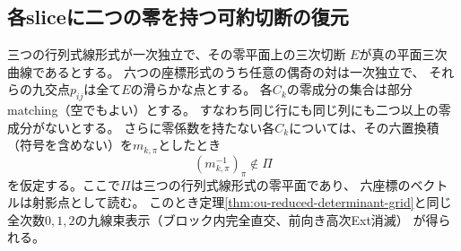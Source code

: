 \subsection{各sliceに二つの零を持つ可約切断の復元}
\label{subsec:ou-sparse-two-zero-grid}

\begin{lemma}[疎な係数行列に対する被約格子復元]
\label{lem:ou-two-zero-slice-grid}
三つの行列式線形式が一次独立で、その零平面上の三次切断
$E$が真の平面三次曲線であるとする。
六つの座標形式のうち任意の偶奇の対は一次独立で、
それらの九交点$p_{ij}$は全て$E$の滑らかな点とする。
各$C_k$の零成分の集合は部分matching（空でもよい）とする。
すなわち同じ行にも同じ列にも二つ以上の零成分がないとする。
さらに零係数を持たない各$C_k$については、その六置換積
（符号を含めない）を$m_{k,\pi}$としたとき
\[
 (m_{k,\pi}^{-1})_\pi\notin\Pi
\]
を仮定する。ここで$\Pi$は三つの行列式線形式の零平面であり、
六座標のベクトルは射影点として読む。
このとき定理\ref{thm:ou-reduced-determinant-grid}と同じ
全次数$0,1,2$の九線束表示（ブロック内完全直交、前向き高次Ext消滅）
が得られる。
\end{lemma}
